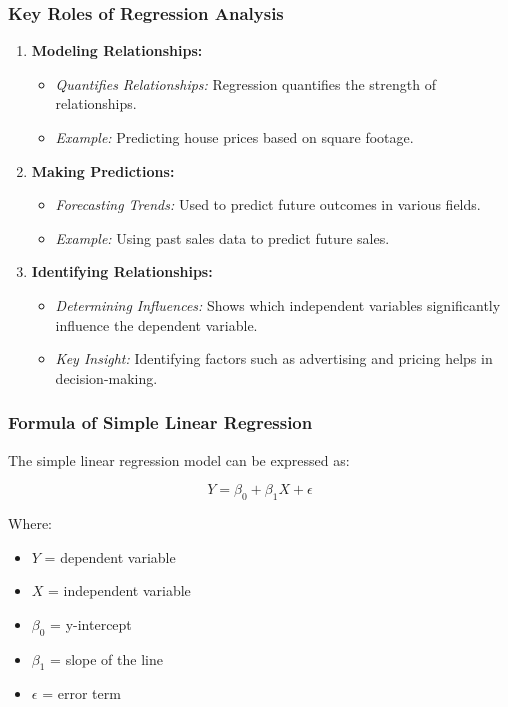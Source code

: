 \documentclass{beamer}
\begin{document}
\begin{frame}[fragile]
    \frametitle{Key Roles of Regression Analysis}
    
    \begin{enumerate}
        \item \textbf{Modeling Relationships:}
            \begin{itemize}
                \item \textit{Quantifies Relationships:} Regression quantifies the strength of relationships. 
                \item \textit{Example:} Predicting house prices based on square footage.
            \end{itemize}

        \item \textbf{Making Predictions:}
            \begin{itemize}
                \item \textit{Forecasting Trends:} Used to predict future outcomes in various fields.
                \item \textit{Example:} Using past sales data to predict future sales.
            \end{itemize}
        
        \item \textbf{Identifying Relationships:}
            \begin{itemize}
                \item \textit{Determining Influences:} Shows which independent variables significantly influence the dependent variable.
                \item \textit{Key Insight:} Identifying factors such as advertising and pricing helps in decision-making.
            \end{itemize}
    \end{enumerate}
\end{frame}

\begin{frame}[fragile]
    \frametitle{Formula of Simple Linear Regression}
    
    The simple linear regression model can be expressed as:
    
    \begin{equation}
        Y = \beta_0 + \beta_1X + \epsilon
    \end{equation}
    
    Where:
    \begin{itemize}
        \item $Y$ = dependent variable
        \item $X$ = independent variable
        \item $\beta_0$ = y-intercept
        \item $\beta_1$ = slope of the line
        \item $\epsilon$ = error term
    \end{itemize}
\end{frame}
\end{document}
